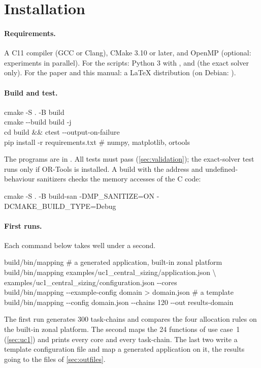 \section{Installation}
\label{sec:install}

\paragraph{Requirements.} A C11 compiler (GCC or Clang), CMake 3.10 or
later, and OpenMP (optional: experiments in parallel). For the scripts:
Python 3 with ,  and  (the exact
solver only). For the paper and this manual: a LaTeX distribution (on
Debian: ).

\paragraph{Build and test.}
\begin{shell}
cmake -S . -B build\\
cmake -{}-build build -j\\
cd build \&\& ctest -{}-output-on-failure\\
pip install -r requirements.txt \quad\# numpy, matplotlib, ortools
\end{shell}
The programs are in . All tests must pass
(\cref{sec:validation}); the exact-solver test runs only if OR-Tools is
installed. A build with the address and undefined-behaviour sanitizers
checks the memory accesses of the C code:
\begin{shell}
cmake -S . -B build-san -DMP\_SANITIZE=ON -DCMAKE\_BUILD\_TYPE=Debug
\end{shell}

\paragraph{First runs.} Each command below takes well under a second.
\begin{shell}
build/bin/mapping \quad\# a generated application, built-in zonal platform\\
build/bin/mapping examples/uc1\_central\_sizing/application.json \textbackslash\\
\quad examples/uc1\_central\_sizing/configuration.json -{}-cores\\
build/bin/mapping -{}-example-config domain > domain.json \quad\# a template\\
build/bin/mapping -{}-config domain.json -{}-chains 120 -{}-out results-domain
\end{shell}
The first run generates 300 task-chains and compares the four allocation
rules on the built-in zonal platform. The second maps the 24 functions of
use case~1 (\cref{sec:uc1}) and prints every core and every task-chain.
The last two write a template configuration file and map a generated
application on it, the results going to the files of
\cref{sec:outfiles}.
